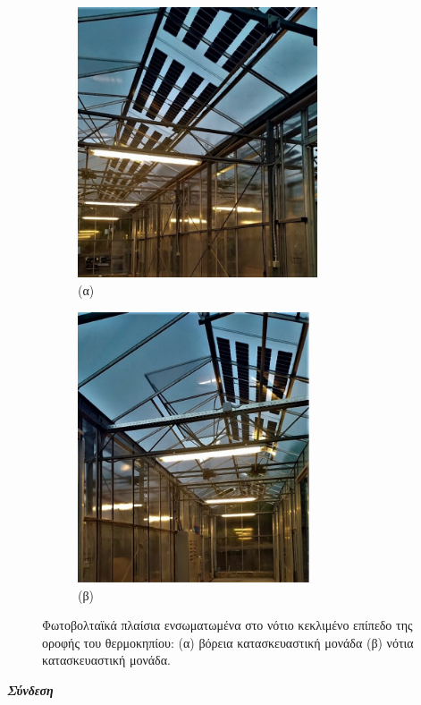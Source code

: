 \documentclass[12pt, a4paper]{report} %
\begin{document}
\begin{figure}[ht]
    \centering
    \begin{subfigure}{0.5\textwidth}
        \centering
        \includegraphics[width=0.8\linewidth, height=80mm]{Figures/PVs_northern.jpg}
        \caption*{(α)}{}
    \end{subfigure}%
    \begin{subfigure}{0.5\textwidth}
        \centering
        \includegraphics[width=0.8\linewidth, height=80mm]{Figures/PVs_southern.jpg}
        \caption*{(β)}{}
    \end{subfigure}%
    \caption{Φωτοβολταϊκά πλαίσια ενσωματωμένα στο νότιο κεκλιμένο επίπεδο της οροφής του θερμοκηπίου: (α) βόρεια 
    κατασκευαστική μονάδα (β) νότια κατασκευαστική μονάδα.}
    \label{fig_PVs_greenhouse}
\end{figure}

\pagebreak

\noindent \textit{\textbf{Σύνδεση}}

\vspace{0.2cm}
\end{document}
